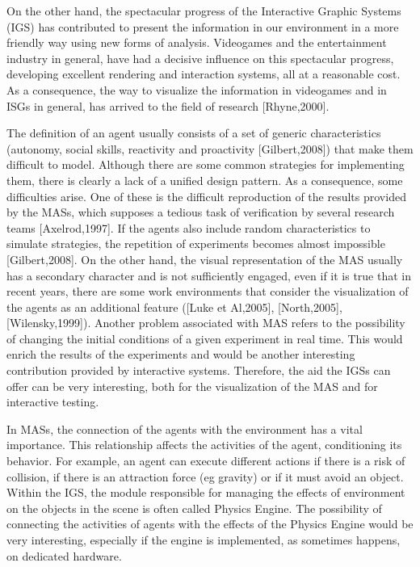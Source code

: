 \documentclass[runningheads]{llncs}
\begin{document}
On the other hand, the spectacular progress of the Interactive Graphic Systems (IGS) has contributed to present the information in our environment in a more friendly way using new forms of analysis. Videogames and the entertainment industry in general, have had a decisive influence on this spectacular progress, developing excellent rendering and interaction systems, all at a reasonable cost. As a consequence, the way to visualize the information in videogames and in ISGs in general, has arrived to the field of research [Rhyne,2000].

The definition of an agent usually consists of a set of generic characteristics (autonomy, social skills, reactivity and proactivity [Gilbert,2008]) that make them difficult to model. Although there are some common strategies for implementing them, there is clearly a lack of a unified design pattern. As a consequence, some difficulties arise. One of these is the difficult reproduction of the results provided by the MASs, which supposes a tedious task of verification by several research teams [Axelrod,1997]. If the agents also include random characteristics to simulate strategies, the repetition of experiments becomes almost impossible [Gilbert,2008]. On the other hand, the visual representation of the MAS usually has a secondary character and is not sufficiently engaged, even if it is true that in recent years, there are some work environments that consider the visualization of the agents as an additional feature ([Luke et Al,2005], [North,2005], [Wilensky,1999]). Another problem associated with MAS refers to the possibility of changing the initial conditions of a given experiment in real time. This would enrich the results of the experiments and would be another interesting contribution provided by interactive systems. Therefore, the aid the IGSs can offer can be very interesting, both for the visualization of the MAS and for interactive testing.

In MASs, the connection of the agents with the environment has a vital importance. This relationship affects the activities of the agent, conditioning its behavior. For example, an agent can execute different actions if there is a risk of collision, if there is an attraction force (eg gravity) or if it must avoid an object. Within the IGS, the module responsible for managing the effects of environment on the objects in the scene is often called Physics Engine. The possibility of connecting the activities of agents with the effects of the Physics Engine would be very interesting, especially if the engine is implemented, as sometimes happens, on dedicated hardware.
\end{document}
